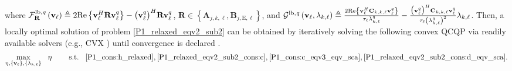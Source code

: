 \documentclass[12pt,draftclsnofoot, onecolumn]{IEEEtran}
\theoremstyle{plain}
\begin{document}
\begin{sloppypar}
\begin{align}
\end{align}%
where $\mathcal F^{\rm lb,\it q}_{\mathbf R}\left(\mathbf v_\ell\right) \triangleq 2{\rm Re}\left\lbrace \mathbf v_\ell^H\mathbf R\mathbf v_\ell^q\right\rbrace - \big(\mathbf v_\ell^q\big)^H\mathbf R\mathbf v_\ell^q$, $\mathbf R \in \left\lbrace\mathbf A_{j,k,\ell}, \mathbf B_{j,\mathrm E,\ell} \right\rbrace$, and $\mathcal G^{\rm lb, \it q}\left(\mathbf v_\ell, \lambda_{k,\ell}\right) \triangleq \frac{2{\rm Re}\left\lbrace\mathbf v_\ell^H\mathbf C_{k,k,\ell}\mathbf v_\ell^q\right\rbrace}{\tau_\ell\lambda_{k,\ell}^q} - \frac{\big(\mathbf v_\ell^q\big)^H\mathbf C_{k,k,\ell}\mathbf v_\ell^q}{\tau_\ell\left( \lambda_{k,\ell}^q\right)^2}\lambda_{k,\ell}$. Then, a locally optimal solution of problem \eqref{P1_relaxed_eqv2_sub2} can be obtained by iteratively solving the following convex QCQP via readily available solvers (e.g., CVX \cite{2004_S.Boyd_cvx}) until convergence is declared \cite{2010_Dinh_SCA_converge}.
\begin{align}\label{P1_relaxed_eqv2_sub2_sca}
\underset{\eta,\{\mathbf v_\ell\},\{\lambda_{k,\ell}\}}{\max} \hspace{3mm} \eta \hspace{8mm}
\text{s.t.} \hspace{3mm}  \eqref{P1_cons:h_relaxed}, \eqref{P1_relaxed_eqv2_sub2_cons:c}, \eqref{P1_cons:c_eqv3_eqv_sca}, \eqref{P1_relaxed_eqv2_sub2_cons:d_eqv_sca}. 
\end{align}%


\end{sloppypar}
\end{document}
